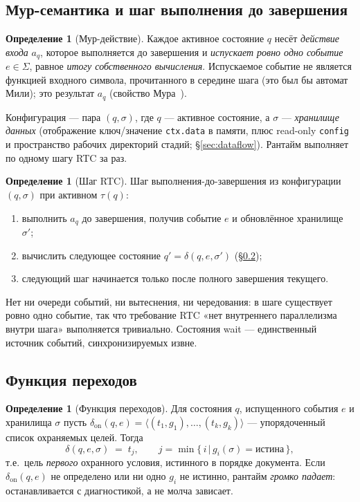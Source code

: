 \documentclass[11pt]{article}
\theoremstyle{plain}
\theoremstyle{definition}
\newtheorem{definition}[theorem]{Определение}
\theoremstyle{remark}
\newcommand{\code}[1]{\texttt{#1}}
\newcommand{\state}[1]{\textsf{#1}}
\newcommand{\transition}{\ensuremath{\delta}}
\newcommand{\given}{\,\vert\,}
\begin{document}
\subsection{Мур-семантика и шаг выполнения до завершения}

\begin{definition}[Мур-действие]
Каждое активное состояние $q$ несёт \emph{действие входа} $a_q$, которое выполняется до
завершения и \emph{испускает ровно одно событие} $e \in \Sigma$, равное \emph{итогу
собственного вычисления}. Испускаемое событие не является функцией входного символа,
прочитанного в середине шага (это был бы автомат Мили); это результат $a_q$
(свойство Мура~\cite{moore}).
\end{definition}

Конфигурация --- пара $(q, \sigma)$, где $q$ --- активное состояние, а $\sigma$ ---
\emph{хранилище данных} (отображение ключ/значение \code{ctx.data} в памяти, плюс
read-only \code{config} и пространство рабочих директорий стадий; \S\ref{sec:dataflow}).
Рантайм выполняет по одному шагу RTC за раз.

\begin{definition}[Шаг RTC]\label{def:rtc}
Шаг выполнения-до-завершения из конфигурации $(q,\sigma)$ при активном $\tau(q)$:
\begin{enumerate}[nosep]
  \item выполнить $a_q$ до завершения, получив событие $e$ и обновлённое хранилище $\sigma'$;
  \item вычислить следующее состояние $q' = \transition(q, e, \sigma')$ (\S\ref{sec:delta});
  \item следующий шаг начинается только после полного завершения текущего.
\end{enumerate}
Нет ни очереди событий, ни вытеснения, ни чередования: в шаге существует ровно одно
событие, так что требование RTC «нет внутреннего параллелизма внутри шага» выполняется
тривиально. Состояния \state{wait} --- единственный источник событий, синхронизируемых
извне.
\end{definition}

\subsection{Функция переходов}\label{sec:delta}

\begin{definition}[Функция переходов]\label{def:delta}
Для состояния $q$, испущенного события $e$ и хранилища $\sigma$ пусть
$\delta_{\mathrm{on}}(q,e) = \langle (t_1,g_1), \dots, (t_k,g_k)\rangle$ --- упорядоченный
список охраняемых целей. Тогда
\[
  \transition(q,e,\sigma) \;=\; t_{j}, \qquad
  j = \min\{\, i \given g_i(\sigma) = \text{истина} \,\},
\]
т.е.\ цель \emph{первого} охранного условия, истинного в порядке документа. Если
$\delta_{\mathrm{on}}(q,e)$ не определено или ни одно $g_i$ не истинно, рантайм
\emph{громко падает}: останавливается с диагностикой, а не молча зависает.
\end{definition}
\end{document}
